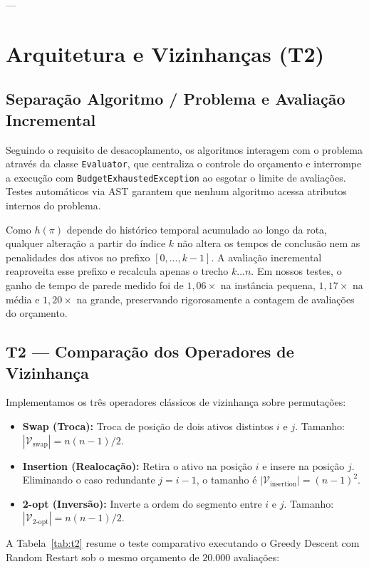\documentclass[11pt,a4paper]{article}
\begin{document}
---

\section{Arquitetura e Vizinhanças (T2)}

\subsection{Separação Algoritmo / Problema e Avaliação Incremental}
Seguindo o requisito de desacoplamento, os algoritmos interagem com o problema através da classe \texttt{Evaluator}, que centraliza o controle do orçamento e interrompe a execução com \texttt{BudgetExhaustedException} ao esgotar o limite de avaliações. Testes automáticos via AST garantem que nenhum algoritmo acessa atributos internos do problema.

Como $h(\pi)$ depende do histórico temporal acumulado ao longo da rota, qualquer alteração a partir do índice $k$ não altera os tempos de conclusão nem as penalidades dos ativos no prefixo $[0, \dots, k-1]$. A avaliação incremental reaproveita esse prefixo e recalcula apenas o trecho $k \dots n$. Em nossos testes, o ganho de tempo de parede medido foi de $1,06\times$ na instância pequena, $1,17\times$ na média e $1,20\times$ na grande, preservando rigorosamente a contagem de avaliações do orçamento.

\subsection{T2 --- Comparação dos Operadores de Vizinhança}
Implementamos os três operadores clássicos de vizinhança sobre permutações:
\begin{itemize}
    \item \textbf{Swap (Troca):} Troca de posição de dois ativos distintos $i$ e $j$. Tamanho: $|\mathcal{V}_{\text{swap}}| = n(n-1)/2$.
    \item \textbf{Insertion (Realocação):} Retira o ativo na posição $i$ e insere na posição $j$. Eliminando o caso redundante $j = i-1$, o tamanho é $|\mathcal{V}_{\text{insertion}}| = (n-1)^2$.
    \item \textbf{2-opt (Inversão):} Inverte a ordem do segmento entre $i$ e $j$. Tamanho: $|\mathcal{V}_{\text{2-opt}}| = n(n-1)/2$.
\end{itemize}

A Tabela~\ref{tab:t2} resume o teste comparativo executando o Greedy Descent com Random Restart sob o mesmo orçamento de $20.000$ avaliações:
\end{document}
